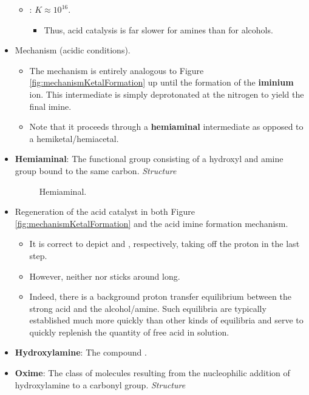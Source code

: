 \documentclass[../notes.tex]{subfiles}
\begin{document}
\begin{itemize}
\begin{itemize}
        \item {}: $K\approx 10^{16}$.
        \begin{itemize}
            \item Thus, acid catalysis is far slower for amines than for alcohols.
        \end{itemize}
    \end{itemize}
    \item Mechanism (acidic conditions).
    \begin{itemize}
        \item The mechanism is entirely analogous to Figure \ref{fig:mechanismKetalFormation} up until the formation of the \textbf{iminium} ion. This intermediate is simply deprotonated at the nitrogen to yield the final imine.
        \item Note that it proceeds through a \textbf{hemiaminal} intermediate as opposed to a hemiketal/hemiacetal.
    \end{itemize}
    \item \textbf{Hemiaminal}: The functional group consisting of a hydroxyl and amine group bound to the same carbon. \emph{Structure}
    \begin{figure}[h!]
        \centering
        \footnotesize
        \caption{Hemiaminal.}
        \label{fig:hemiaminal}
    \end{figure}
    \item Regeneration of the acid catalyst in both Figure \ref{fig:mechanismKetalFormation} and the acid imine formation mechanism.
    \begin{itemize}
        \item It is correct to depict  and , respectively, taking off the proton in the last step.
        \item However, neither  nor  sticks around long.
        \item Indeed, there is a background proton transfer equilibrium between the strong acid and the alcohol/amine. Such equilibria are typically established much more quickly than other kinds of equilibria and serve to quickly replenish the quantity of free acid in solution.
    \end{itemize}
    \item \textbf{Hydroxylamine}: The compound .
    \item \textbf{Oxime}: The class of molecules resulting from the nucleophilic addition of hydroxylamine to a carbonyl group. \emph{Structure}

\end{itemize}
\end{document}
